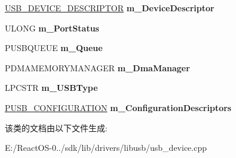 \begin{DoxyCompactItemize}
\hyperlink{struct___u_s_b___d_e_v_i_c_e___d_e_s_c_r_i_p_t_o_r}{U\+S\+B\+\_\+\+D\+E\+V\+I\+C\+E\+\_\+\+D\+E\+S\+C\+R\+I\+P\+T\+OR} {\bfseries m\+\_\+\+Device\+Descriptor}
\item 
\mbox{\label{class_c_u_s_b_device_a0ea1d21492fe7aae5f6c8ff63426330a}} 
U\+L\+O\+NG {\bfseries m\+\_\+\+Port\+Status}
\item 
\mbox{\label{class_c_u_s_b_device_a1423c2ef2aa322c744474e487fcabd67}} 
P\+U\+S\+B\+Q\+U\+E\+UE {\bfseries m\+\_\+\+Queue}
\item 
\mbox{\label{class_c_u_s_b_device_a5aefb540a7688d5d4b09ae2257fb1f5c}} 
P\+D\+M\+A\+M\+E\+M\+O\+R\+Y\+M\+A\+N\+A\+G\+ER {\bfseries m\+\_\+\+Dma\+Manager}
\item 
\mbox{\label{class_c_u_s_b_device_afd33df9500e08b08a8368ebbcc894f17}} 
L\+P\+C\+S\+TR {\bfseries m\+\_\+\+U\+S\+B\+Type}
\item 
\mbox{\label{class_c_u_s_b_device_a1f33429b9d9ea5d814bd4b7c4b3bdf8c}} 
\hyperlink{struct_u_s_b___c_o_n_f_i_g_u_r_a_t_i_o_n}{P\+U\+S\+B\+\_\+\+C\+O\+N\+F\+I\+G\+U\+R\+A\+T\+I\+ON} {\bfseries m\+\_\+\+Configuration\+Descriptors}
\end{DoxyCompactItemize}


该类的文档由以下文件生成\+:\begin{DoxyCompactItemize}
\item 
E\+:/\+React\+O\+S-\/0../sdk/lib/drivers/libusb/usb\+\_\+device.\+cpp\end{DoxyCompactItemize}
